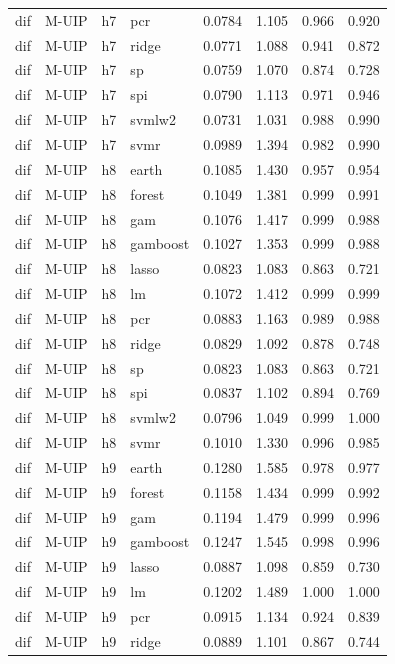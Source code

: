 \begin{ThreePartTable}
\begin{longtable}[t]{llclcccc}
dif & M-UIP & h7 & pcr & 0.0784 & 1.105 & 0.966 & 0.920\\
dif & M-UIP & h7 & ridge & 0.0771 & 1.088 & 0.941 & 0.872\\
dif & M-UIP & h7 & sp & 0.0759 & 1.070 & 0.874 & 0.728\\
dif & M-UIP & h7 & spi & 0.0790 & 1.113 & 0.971 & 0.946\\
dif & M-UIP & h7 & svmlw2 & 0.0731 & 1.031 & 0.988 & 0.990\\
dif & M-UIP & h7 & svmr & 0.0989 & 1.394 & 0.982 & 0.990\\
\addlinespace
dif & M-UIP & h8 & earth & 0.1085 & 1.430 & 0.957 & 0.954\\
dif & M-UIP & h8 & forest & 0.1049 & 1.381 & 0.999 & 0.991\\
dif & M-UIP & h8 & gam & 0.1076 & 1.417 & 0.999 & 0.988\\
dif & M-UIP & h8 & gamboost & 0.1027 & 1.353 & 0.999 & 0.988\\
dif & M-UIP & h8 & lasso & 0.0823 & 1.083 & 0.863 & 0.721\\
dif & M-UIP & h8 & lm & 0.1072 & 1.412 & 0.999 & 0.999\\
dif & M-UIP & h8 & pcr & 0.0883 & 1.163 & 0.989 & 0.988\\
dif & M-UIP & h8 & ridge & 0.0829 & 1.092 & 0.878 & 0.748\\
dif & M-UIP & h8 & sp & 0.0823 & 1.083 & 0.863 & 0.721\\
dif & M-UIP & h8 & spi & 0.0837 & 1.102 & 0.894 & 0.769\\
dif & M-UIP & h8 & svmlw2 & 0.0796 & 1.049 & 0.999 & 1.000\\
dif & M-UIP & h8 & svmr & 0.1010 & 1.330 & 0.996 & 0.985\\
\addlinespace
dif & M-UIP & h9 & earth & 0.1280 & 1.585 & 0.978 & 0.977\\
dif & M-UIP & h9 & forest & 0.1158 & 1.434 & 0.999 & 0.992\\
dif & M-UIP & h9 & gam & 0.1194 & 1.479 & 0.999 & 0.996\\
dif & M-UIP & h9 & gamboost & 0.1247 & 1.545 & 0.998 & 0.996\\
dif & M-UIP & h9 & lasso & 0.0887 & 1.098 & 0.859 & 0.730\\
dif & M-UIP & h9 & lm & 0.1202 & 1.489 & 1.000 & 1.000\\
dif & M-UIP & h9 & pcr & 0.0915 & 1.134 & 0.924 & 0.839\\
dif & M-UIP & h9 & ridge & 0.0889 & 1.101 & 0.867 & 0.744\\

\end{longtable}
\end{ThreePartTable}
